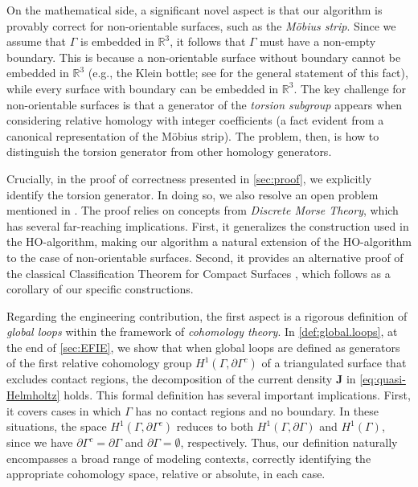 \documentclass[a4paper,twoside,10pt]{article}
\theoremstyle{plain}
\theoremstyle{definition}
\theoremstyle{remark}
\newcommand{\R}{\mathbb{R}}
\begin{document}
On the mathematical side, a significant novel aspect is that our algorithm is provably correct for non-orientable surfaces, such as the \emph{M\"obius strip}.
Since we assume that $ \Gamma $ is embedded in $ \R^3 $, it follows that $ \Gamma $ must have a non-empty boundary. This is because a non-orientable surface without boundary cannot be embedded in $ \R^3 $ (e.g., the Klein bottle; see \cite[Theorem~27.11]{greenberg1981algebraic} for the general statement of this fact), while every surface with boundary can be embedded in $ \R^3 $. The key challenge for non-orientable surfaces is that a generator of the \emph{torsion subgroup} 
appears when considering relative homology with integer coefficients (a fact evident from a canonical representation of the M\"obius strip).
The problem, then, is how to distinguish the torsion generator from other homology generators.

Crucially, in the proof of correctness presented in \cref{sec:proof}, we explicitly identify the torsion generator.
In doing so, we also resolve an open problem mentioned in \cite[Section 7]{dlotko2012fast}.
The proof relies on concepts from \emph{Discrete Morse Theory}, which has several far-reaching implications.
First, it generalizes the construction used in the HO-algorithm, making our algorithm a natural extension of the HO-algorithm to the case of non-orientable surfaces.
Second, it provides an alternative proof of the classical Classification Theorem for Compact Surfaces \cite{gallier2013guide}, which follows as a corollary of our specific constructions.

Regarding the engineering contribution, the first aspect is a rigorous definition of \emph{global loops} \cite{wilton1981improving} within the framework of \emph{cohomology theory}.
In \cref{def:global.loops}, at the end of \cref{sec:EFIE}, we show that when global loops are defined as generators of the first relative cohomology group $H^1(\Gamma, \partial \Gamma^c)$ of a triangulated surface that excludes contact regions, the decomposition of the current density $\bm{J}$ in \cref{eq:quasi-Helmholtz} holds.
This formal definition has several important implications. First, it covers cases in which $\Gamma$ has no contact regions and no boundary.
In these situations, the space $H^1(\Gamma, \partial \Gamma^c)$ reduces to both $H^1(\Gamma, \partial \Gamma)$ and $H^1(\Gamma)$, since we have $\partial \Gamma^c = \partial \Gamma$ and $\partial \Gamma = \emptyset$, respectively.
Thus, our definition naturally encompasses a broad range of modeling contexts, correctly identifying the appropriate cohomology space, relative or absolute, in each case.
\end{document}
